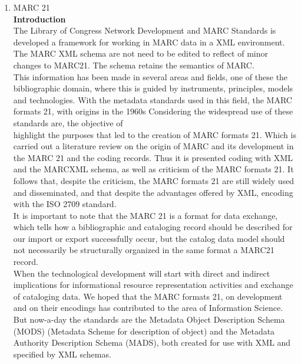 \begin{enumerate}
	\item MARC 21\\
	{\bf Introduction}\\
	The Library of Congress Network Development and MARC Standards is developed a framework for working in MARC data in a XML environment. The MARC XML schema are not need to be edited to reflect of minor changes to MARC21. The schema retains the semantics of MARC.\\
	This information has been made in several areas and fields, one of these the bibliographic domain, where this is guided by instruments, principles, models and technologies. With the metadata standards used in this field, the MARC formats 21, with origins in the 1960s Considering the widespread use of these standards are, the objective of\\
	highlight the purposes that led to the creation of MARC formats 21. Which is carried out a literature review on the origin of MARC and its development in the MARC 21 and the coding records. Thus it is presented coding with XML and the MARCXML schema, as well as criticism of the MARC formats 21. It follows that, despite the criticism, the MARC formats 21 are still widely used and disseminated, and that despite the advantages offered by XML, encoding with the ISO 2709 standard. \\
	It is important to note that the MARC 21 is a format for data exchange, which tells how a bibliographic and cataloging record should be described for our import or export successfully occur, but the catalog data model should not necessarily be structurally organized in the same format a MARC21 record. \\
	When the technological development will start with direct and indirect implications for informational resource representation activities and exchange of cataloging data. We hoped that the MARC formats 21, on development and on their encodings has contributed to the area of Information Science. \\
	But now-a-day the standards are the Metadata Object Description Schema (MODS) (Metadata Scheme for description of object) and the Metadata Authority Description Schema (MADS), both created for use with XML and specified by XML schemas.
	

\end{enumerate}

